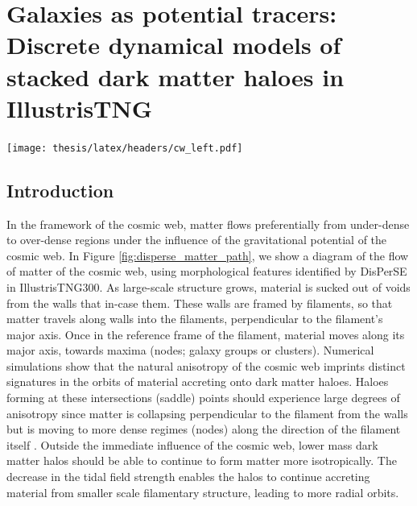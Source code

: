 \chapter[Discrete dynamical models of stacked dark matter haloes]{Galaxies as potential tracers: \\ Discrete dynamical models of stacked dark matter haloes in IllustrisTNG}
\label{ch:dyn_mod}
\vspace{-5.25in}
\texttt{[image: thesis/latex/headers/cw\_left.pdf]}
\vspace{3in}


\section{Introduction}
In the framework of the cosmic web, matter flows preferentially from under-dense to over-dense regions under the influence of the gravitational potential of the cosmic web. In Figure \ref{fig:disperse_matter_path}, we show a diagram of the flow of matter of the cosmic web, using morphological features identified by DisPerSE in IllustrisTNG300. As large-scale structure grows, material is sucked out of voids from the walls that in-case them. These walls are framed by filaments, so that matter travels along walls into the filaments, perpendicular to the filament's major axis. Once in the reference frame of the filament, material moves along its major axis, towards maxima (nodes; galaxy groups or clusters). Numerical simulations show that the natural anisotropy of the cosmic web imprints distinct signatures in the orbits of material accreting onto dark matter haloes. Haloes forming at these intersections (saddle) points should experience large degrees of anisotropy since matter is collapsing perpendicular to the filament from the walls but is moving to more dense regimes (nodes) along the direction of the filament itself \citep[e.g.][for galaxy properties in saddle environments]{kraljic2019saddle}. Outside the immediate influence of the cosmic web, lower mass dark matter halos should be able to continue to form matter more isotropically. The decrease in the tidal field strength enables the halos to continue accreting material from smaller scale filamentary structure, leading to more radial orbits.

